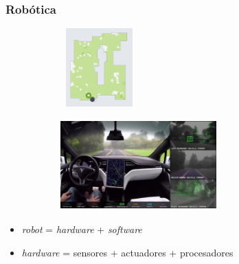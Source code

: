 \documentclass[xcolor={table}]{beamer}
\begin{document}
		
		\begin{frame}
		\frametitle{Robótica}
        \begin{figure}[H]
        \centering
        \begin{subfigure}{\textwidth}
            \includegraphics[width=3cm, height=3cm]{img/roomba.png}
        \label{fig:roomba}
        \end{subfigure}\hfill
        \begin{subfigure}{\textwidth}
            \includegraphics[width=6cm, height=3.5cm]{img/tesla.jpg}
        \label{fig:tesla}
        \end{subfigure}\hfill
        \label{fig:robotica}
        \end{figure}
            \begin{itemize}
                \begin{itemize}
                    \item \textit{robot} = \textit{hardware} + \textit{software}
                    \item \textit{hardware} = sensores + actuadores + procesadores
                \end{itemize}            \end{itemize}{}
		\end{frame}
		
\end{document}

